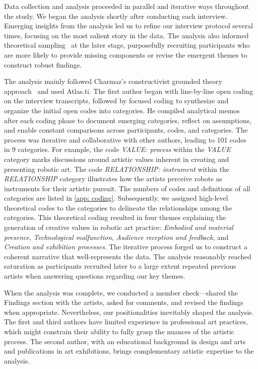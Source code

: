 Data collection and analysis proceeded in parallel and iterative ways throughout the study. We began the analysis shortly after conducting each interview. Emerging insights from the analysis led us to refine our interview protocol several times, focusing on the most salient story in the data. The analysis also informed theoretical sampling~\cite{charmaz2006constructing} at the later stage, purposefully recruiting participants who are more likely to provide missing components or revise the emergent themes to construct robust findings.

The analysis mainly followed Charmaz's constructivist grounded theory approach~\cite{charmaz2006constructing} and used Atlas.ti. The first author began with line-by-line open coding on the interview transcripts, followed by focused coding to synthesize and organize the initial open codes into categories. He compiled analytical memos after each coding phase to document emerging categories, reflect on assumptions, and enable constant comparisons across participants, codes, and categories. The process was iterative and collaborative with other authors, leading to 101 codes in 9 categories. For example, the code \textit{VALUE: process} within the \textit{VALUE} category marks discussions around artistic values inherent in creating and presenting robotic art. The code \textit{RELATIONSHIP: instrument} within the \textit{RELATIONSHIP} category illustrates how the artists perceive robots as instruments for their artistic pursuit. The numbers of codes and definitions of all categories are listed in \autoref{app: coding}. Subsequently, we assigned high-level theoretical codes to the categories to delineate the relationships among the categories. This theoretical coding resulted in four themes explaining the generation of creative values in robotic art practice: \textit{Embodied and material presence}, \textit{Technological malfunction}, \textit{Audience reception and feedback}, and \textit{Creation and exhibition processes}. The iterative process forged us to construct a coherent narrative that well-represents the data. The analysis reasonably reached saturation as participants recruited later to a large extent repeated previous artists when answering questions regarding our key themes.

When the analysis was complete, we conducted a member check---shared the Findings section with the artists, asked for comments, and revised the findings when appropriate. Nevertheless, our positionalities inevitably shaped the analysis. The first and third authors have limited experience in professional art practices, which might constrain their ability to fully grasp the nuances of the artistic process. The second author, with an educational background in design and arts and publications in art exhibitions, brings complementary artistic expertise to the analysis.